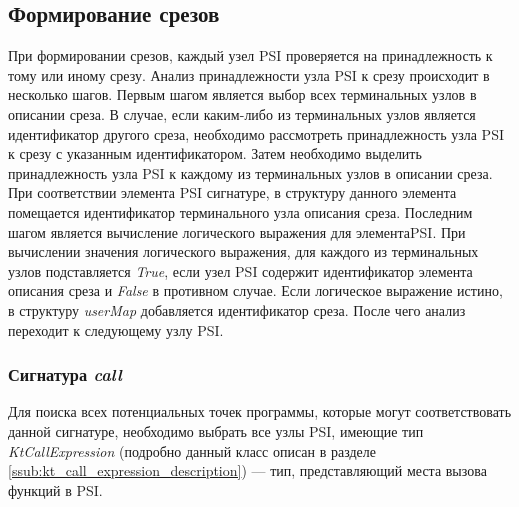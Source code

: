 \subsection{Формирование срезов}
\label{ssec:pointcut_creation_description}
При формировании срезов, каждый узел PSI проверяется на принадлежность к тому или иному срезу.
Анализ принадлежности узла PSI к срезу происходит в несколько шагов.
Первым шагом является выбор всех терминальных узлов в описании среза.
В случае, если каким-либо из терминальных узлов является идентификатор другого
среза, необходимо рассмотреть принадлежность узла PSI к срезу с указанным идентификатором.
Затем необходимо выделить принадлежность узла PSI к каждому из терминальных узлов в описании среза.
При соответствии элемента PSI сигнатуре, в структуру  данного элемента помещается идентификатор терминального узла описания среза.
Последним шагом является вычисление логического выражения для элементаPSI.
При вычислении значения логического выражения, для каждого из терминальных узлов
подставляется \textit{True}, если узел PSI содержит идентификатор элемента описания среза и \textit{False} в противном случае.
Если логическое выражение истино, в структуру \textit{userMap} добавляется идентификатор среза.
После чего анализ переходит к следующему узлу PSI.
\subsubsection{Сигнатура \textit{call}}
\label{ssub:call_signature_mark}
Для поиска всех потенциальных точек программы, которые могут соответствовать
данной сигнатуре, необходимо выбрать все узлы PSI, имеющие тип
\textit{KtCallExpression} (подробно данный класс описан в разделе
\ref{ssub:kt_call_expression_description}) --- тип, представляющий места вызова
функций в PSI.

